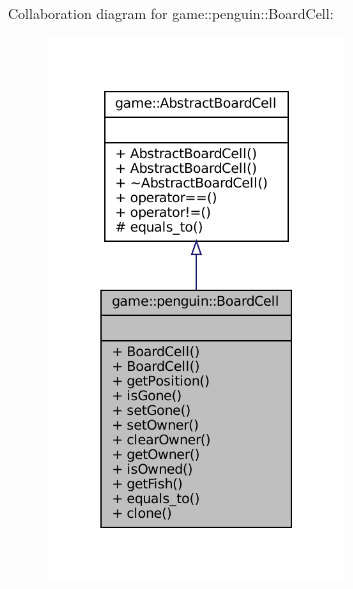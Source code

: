 Collaboration diagram for game\+:\+:penguin\+:\+:Board\+Cell\+:
\nopagebreak
\begin{figure}[H]
\begin{center}
\leavevmode
\includegraphics[width=223pt]{classgame_1_1penguin_1_1_board_cell__coll__graph}
\end{center}
\end{figure}
